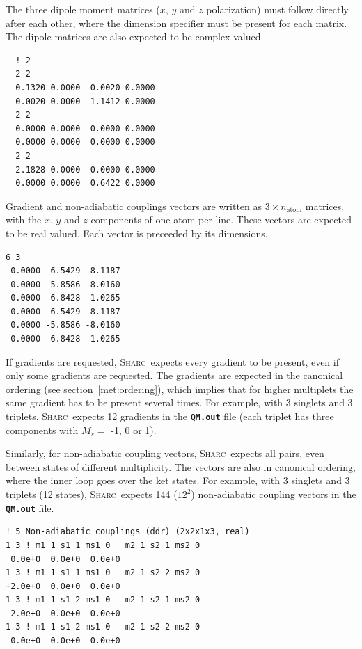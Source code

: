 \documentclass[a4paper,11pt,DIV=15,openany,twoside=false]{scrbook}
\newcommand{\sharc}{\textsc{Sharc}}
\newcommand{\ttt}[1]{\textbf{\texttt{#1}}}
\newenvironment{example}{
  \vspace{0mm}
  \definecolor{shadecolor}{HTML}{E4F4FF}
  \begin{shaded}
}{
  \end{shaded}
}
\begin{document}
The three dipole moment matrices ($x$, $y$ and $z$ polarization) must follow directly after each other, where the dimension specifier must be present for each matrix. The dipole matrices are also expected to be complex-valued.
\begin{example}
  \begin{verbatim}
  ! 2
  2 2
  0.1320 0.0000 -0.0020 0.0000
 -0.0020 0.0000 -1.1412 0.0000
  2 2
  0.0000 0.0000  0.0000 0.0000
  0.0000 0.0000  0.0000 0.0000
  2 2
  2.1828 0.0000  0.0000 0.0000
  0.0000 0.0000  0.6422 0.0000
  \end{verbatim}
\end{example}

Gradient and non-adiabatic couplings vectors are written as $3\times n_\text{atom}$ matrices, with the $x$, $y$ and $z$ components of one atom per line. These vectors are expected to be real valued. Each vector is preceeded by its dimensions.
\begin{example}
  \begin{verbatim}
6 3 
 0.0000 -6.5429 -8.1187
 0.0000  5.8586  8.0160
 0.0000  6.8428  1.0265
 0.0000  6.5429  8.1187
 0.0000 -5.8586 -8.0160
 0.0000 -6.8428 -1.0265
  \end{verbatim}
\end{example}
If gradients are requested, \sharc\ expects every gradient to be present, even if only some gradients are requested. The gradients are expected in the canonical ordering (see section~\ref{met:ordering}), which implies that for higher multiplets the same gradient has to be present several times. For example, with 3 singlets and 3 triplets, \sharc\ expects 12 gradients in the \ttt{QM.out} file (each triplet has three components with $M_s=$ -1, 0 or 1).

Similarly, for non-adiabatic coupling vectors, \sharc\ expects all pairs, even between states of different multiplicity. The vectors are also in canonical ordering, where the inner loop goes over the ket states. For example, with 3 singlets and 3 triplets (12 states), \sharc\ expects 144 ($12^2$) non-adiabatic coupling vectors in the \ttt{QM.out} file.
\begin{example}
  \begin{verbatim}
! 5 Non-adiabatic couplings (ddr) (2x2x1x3, real)
1 3 ! m1 1 s1 1 ms1 0   m2 1 s2 1 ms2 0
 0.0e+0  0.0e+0  0.0e+0 
1 3 ! m1 1 s1 1 ms1 0   m2 1 s2 2 ms2 0
+2.0e+0  0.0e+0  0.0e+0 
1 3 ! m1 1 s1 2 ms1 0   m2 1 s2 1 ms2 0
-2.0e+0  0.0e+0  0.0e+0 
1 3 ! m1 1 s1 2 ms1 0   m2 1 s2 2 ms2 0
 0.0e+0  0.0e+0  0.0e+0 
  \end{verbatim}
\end{example}
\end{document}
